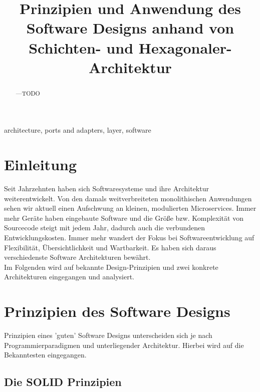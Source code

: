 \documentclass[conference]{IEEEtran}
\begin{document}

\title{Prinzipien und Anwendung des Software Designs anhand von Schichten- und Hexagonaler-Architektur}

\author{
}

\maketitle


\begin{abstract}
---TODO
\end{abstract}

\begin{IEEEkeywords}
architecture, ports and adapters, layer, software
\end{IEEEkeywords}



\section{Einleitung}
Seit Jahrzehnten haben sich Softwaresysteme und ihre Architektur weiterentwickelt. Von den damals weitverbreiteten monolithischen Anwendungen sehen wir aktuell einen Aufschwung an kleinen, modulierten Microservices. Immer mehr Geräte haben eingebaute Software und die Größe bzw. Komplexität von Sourcecode steigt mit jedem Jahr, dadurch auch die verbundenen Entwicklungskosten. Immer mehr wandert der Fokus bei  Softwareentwicklung auf Flexibilität, Übersichtlichkeit und Wartbarkeit. Es haben sich daraus verschiedenste Software Architekturen bewährt. \\
Im Folgenden wird auf bekannte Design-Prinzipien und zwei konkrete Architekturen eingegangen und analysiert.



\section{Prinzipien des Software Designs}

Prinzipien eines 'guten' Software Designs unterscheiden sich je nach Programmierparadigmen und unterliegender Architektur. Hierbei wird auf die Bekanntesten eingegangen.

\subsection{Die SOLID Prinzipien}
\end{document}
